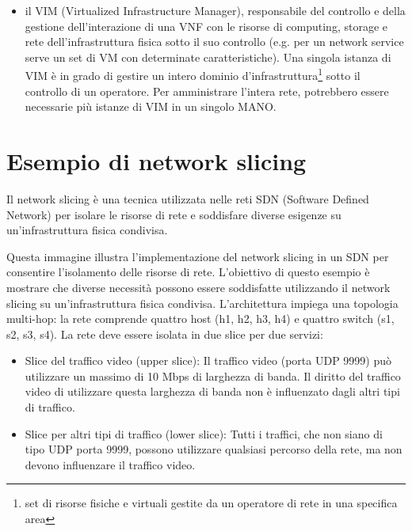 \begin{itemize}
    \item il VIM (Virtualized Infrastructure Manager), responsabile del controllo e della gestione dell'interazione di una VNF con le risorse di computing, storage e rete dell'infrastruttura fisica sotto il suo controllo (e.g. per un network service serve un set di VM con determinate caratteristiche). Una singola istanza di VIM è in grado di gestire un intero dominio d'infrastruttura\footnote{set di risorse fisiche e virtuali gestite da un operatore di rete in una specifica area} sotto il controllo di un operatore. Per amministrare l'intera rete, potrebbero essere necessarie più istanze di VIM in un singolo MANO.
\end{itemize}

\section{Esempio di network slicing}

Il network slicing è una tecnica utilizzata nelle reti SDN (Software Defined Network) per isolare le risorse di rete e soddisfare diverse esigenze su un'infrastruttura fisica condivisa. 

Questa immagine illustra l'implementazione del network slicing in un SDN per consentire l'isolamento delle risorse di rete. L'obiettivo di questo esempio è mostrare che diverse necessità possono essere soddisfatte utilizzando il network slicing su un'infrastruttura fisica condivisa. L'architettura impiega una topologia multi-hop: la rete comprende quattro host (h1, h2, h3, h4) e quattro switch (s1, s2, s3, s4). La rete deve essere isolata in due slice per due servizi:
\begin{itemize}
    \item Slice del traffico video (upper slice): Il traffico video (porta UDP 9999) può utilizzare un massimo di 10 Mbps di larghezza di banda. Il diritto del traffico video di utilizzare questa larghezza di banda non è influenzato dagli altri tipi di traffico.
    \item Slice per altri tipi di traffico (lower slice): Tutti i traffici, che non siano di tipo UDP porta 9999, possono utilizzare qualsiasi percorso della rete, ma non devono influenzare il traffico video.
\end{itemize}



